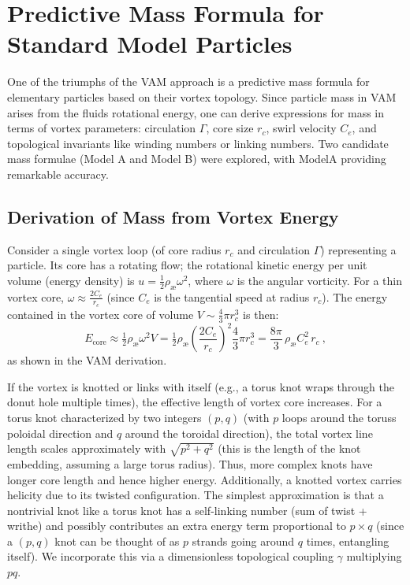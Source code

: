 \section{Predictive Mass Formula for Standard Model Particles}

One of the triumphs of the VAM approach is a predictive mass formula for elementary particles based on their vortex topology. Since particle mass in VAM arises from the fluid\rqs s rotational energy, one can derive expressions for mass in terms of vortex parameters: circulation $\Gamma$, core size $r_c$, swirl velocity $C_e$, and topological invariants like winding numbers or linking numbers. Two candidate mass formulae (Model A and Model B) were explored, with ModelA providing remarkable accuracy.

\subsection{Derivation of Mass from Vortex Energy}

Consider a single vortex loop (of core radius $r_c$ and circulation $\Gamma$) representing a particle. Its core has a rotating flow; the rotational kinetic energy per unit volume (energy density) is $u = \tfrac{1}{2}\rho_{\text{\ae}}\omega^2$, where $\omega$ is the angular vorticity. For a thin vortex core, $\omega \approx \frac{2 C_e}{r_c}$ (since $C_e$ is the tangential speed at radius $r_c$). The energy contained in the vortex core of volume $V \sim \frac{4}{3}\pi r_c^3$ is then:
\[
    E_{\text{core}} \approx \tfrac{1}{2}\rho_{\text{\ae}}\omega^2 V = \tfrac{1}{2}\rho_{\text{\ae}}\left(\frac{2C_e}{r_c}\right)^2 \frac{4}{3}\pi r_c^3 = \frac{8\pi}{3}\,\rho_{\text{\ae}} C_e^2\, r_c~,
\]
as shown in the VAM derivation.

If the vortex is knotted or links with itself (e.g., a torus knot wraps through the donut hole multiple times), the effective length of vortex core increases. For a torus knot characterized by two integers $(p, q)$ (with $p$ loops around the torus\rqs s poloidal direction and $q$ around the toroidal direction), the total vortex line length scales approximately with $\sqrt{p^2+q^2}$ (this is the length of the knot embedding, assuming a large torus radius). Thus, more complex knots have longer core length and hence higher energy. Additionally, a knotted vortex carries helicity due to its twisted configuration. The simplest approximation is that a nontrivial knot like a torus knot has a self-linking number (sum of twist + writhe) and possibly contributes an extra energy term proportional to $p \times q$ (since a $(p,q)$ knot can be thought of as $p$ strands going around $q$ times, entangling itself). We incorporate this via a dimensionless topological coupling $\gamma$ multiplying $p q$.

